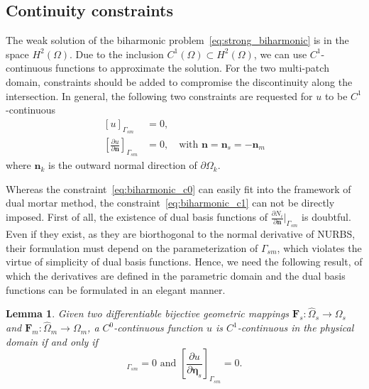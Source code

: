 \documentclass[preprint,12pt]{elsarticle}
\newtheorem{lemma}{Lemma}
\theoremstyle{remark}
\begin{document}
\subsection{Continuity constraints}
The weak solution of the biharmonic problem~\eqref{eq:strong_biharmonic} is in the space $H^2(\Omega)$. Due to the inclusion $C^1(\Omega)\subset{}H^2(\Omega)$, we can use $C^1$-continuous functions to approximate the solution. For the two multi-patch domain, constraints should be added to compromise the discontinuity along the intersection. In general, the following two constraints are requested for $u$ to be $C^1$-continuous
\begin{subequations}
    \begin{align}
        [u]_{\Gamma_{sm}}&=0,\label{eq:biharmonic_c0}\\
        [\frac{\partial{u}}{\partial{\mathbf{n}}}]_{\Gamma_{sm}}&=0,\quad\text{with }\mathbf{n}=\mathbf{n}_s=-\mathbf{n}_m\label{eq:biharmonic_c1}
    \end{align}
\end{subequations}
where $\mathbf{n}_k$ is the outward normal direction of $\partial{\Omega_k}$.\par
Whereas the constraint~\eqref{eq:biharmonic_c0} can easily fit into the framework of dual mortar method, the constraint~\eqref{eq:biharmonic_c1} can not be directly imposed. First of all, the existence of dual basis functions of $\frac{\partial{N_i}}{\partial{\mathbf{n}}}\vert_{\Gamma_{sm}}$ is doubtful. Even if they exist, as they are biorthogonal to the normal derivative of NURBS, their formulation must depend on the parameterization of $\Gamma_{sm}$, which violates the virtue of simplicity of dual basis functions. Hence, we need the following result, of which the derivatives are defined in the parametric domain and the dual basis functions can be formulated in an elegant manner.\par
\begin{lemma}
    Given two differentiable bijective geometric mappings $\mathbf{F}_{s}\colon\hat{\Omega}_s\rightarrow{\Omega}_s$ and $\mathbf{F}_{m}\colon\hat{\Omega}_m\rightarrow{\Omega}_m$, a $C^0$-continuous function $u$ is $C^1$-continuous in the physical domain if and only if
    \begin{equation}
        [\frac{\partial{u}}{\partial{\mathbf{\xi}_s}}]_{\Gamma_{sm}}=0\text{ and }[\frac{\partial{u}}{\partial{\mathbf{\eta}_s}}]_{\Gamma_{sm}}=0. \label{eq:biharmonic_c1_mod}
    \end{equation} 
\end{lemma}
     
\end{document}
